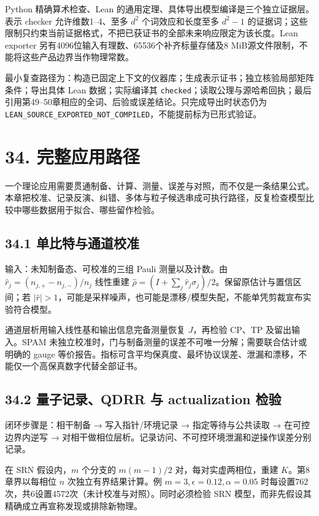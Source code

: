 \documentclass[
  11pt,
  oneside]{book}
\begin{document}
Python 精确算术检查、Lean
的通用定理、具体导出模型编译是三个独立证据层。表示 checker
允许维数1--4、至多 \(d^2\) 个词效应和长度至多 \(d^2-1\)
的证据词；这些限制只约束当前证据格式，不把已获证书的全部未来响应限定为该长度。Lean
exporter 另有4096位输入有理数、65536个补齐标量存储及8
MiB源文件限制，不能将这些产品边界当作物理常数。

最小复查路径为：构造已固定上下文的仪器库；生成表示证书；独立核验局部矩阵条件；导出具体
Lean 数据；实际编译其
\texttt{checked}；读取公理与源哈希回执；最后引用第49--50章相应的全词、后验或误差结论。只完成导出时状态仍为
\texttt{LEAN\_\allowbreak SOURCE\_\allowbreak EXPORTED\_\allowbreak NOT\_\allowbreak COMPILED}，不能提前标为已形式验证。

\chapter{34. 完整应用路径}\label{ch-34}\hypertarget{ch-34}{}

一个理论应用需要贯通制备、计算、测量、误差与对照，而不仅是一条结果公式。本章把校准、记录反演、纠错、多体与粒子候选串成可执行路径，反复检查模型比较中哪些数据用于拟合、哪些留作检验。

\section{34.1 单比特与通道校准}

输入：未知制备态、可校准的三组 Pauli 测量以及计数。由
\(\hat r_j=(n_{j,+}-n_{j,-})/n_j\) 线性重建
\(\hat\rho=(I+\sum_j\hat r_j\sigma_j)/2\)。保留原估计与置信区间；若
\(|\hat r|>1\)，可能是采样噪声，也可能是漂移/模型失配，不能单凭剪裁宣布实验符合模型。

通道层析用输入线性基和输出信息完备测量恢复 \(J\)，再检验 CP、TP
及留出输入。SPAM
未独立校准时，门与制备测量的误差不可唯一分解；需要联合估计或明确的 gauge
等价报告。指标可含平均保真度、最坏协议误差、泄漏和漂移，不能仅一个高保真数字代替全部证书。

\section{34.2 量子记录、QDRR 与 actualization 检验}

闭环步骤是：相干制备 → 写入指针/环境记录 → 指定等待与公共读取 →
在可控边界内逆写 →
对相干做相位层析。记录访问、不可控环境泄漏和逆操作误差分别记录。

在 SRN 假设内，\(m\) 个分支的 \(m(m-1)/2\) 对，每对实虚两相位，重建
\(K\)。第8章界以每相位 \(n\) 次独立有界结果计算。例
\(m=3,\epsilon=0.12,\alpha=0.05\)
时每设置762次，共6设置4572次（未计校准与对照）。同时必须检验 SRN
模型，而非先假设其精确成立再宣称发现或排除新物理。
\end{document}
